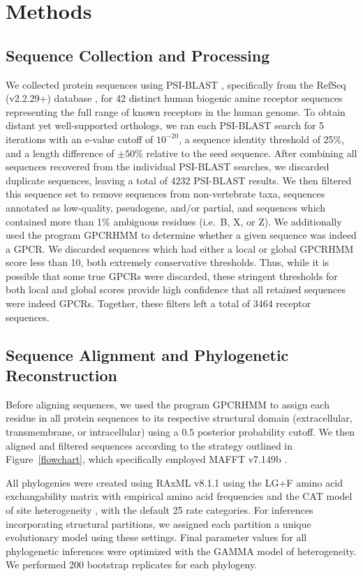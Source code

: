 \documentclass[fleqn,10pt]{wlpeerj}
\begin{document}
\section*{Methods}

\subsection*{Sequence Collection and Processing}
We collected protein sequences using PSI-BLAST \citep{psiblast}, specifically from the RefSeq (v2.2.29+) database \citep{refseq}, for 42 distinct human biogenic amine receptor sequences representing the full range of known receptors in the human genome. To obtain distant yet well-supported orthologs, we ran each PSI-BLAST search for 5 iterations with an e-value cutoff of $10^{-20}$, a sequence identity threshold of 25\%, and a length difference of $\pm50$\% relative to the seed sequence. After combining all sequences recovered from the individual PSI-BLAST searches, we discarded duplicate sequences, leaving a total of 4232 PSI-BLAST results. We then filtered this sequence set to remove sequences from non-vertebrate taxa, sequences annotated as low-quality, pseudogene, and/or partial, and sequences which contained more than 1\% ambiguous residues (i.e.\ B, X, or Z). We additionally used the program GPCRHMM \citep{Wistrand2006} to determine whether a given sequence was indeed a GPCR. We discarded sequences which had either a local or global GPCRHMM score less than 10, both extremely conservative thresholds. Thus, while it is possible that some true GPCRs were discarded, these stringent thresholds for both local and global scores provide high confidence that all retained sequences were indeed GPCRs. Together, these filters left a total of 3464 receptor sequences.


\subsection*{Sequence Alignment and Phylogenetic Reconstruction}
Before aligning sequences, we used the program GPCRHMM \citep{Wistrand2006} to assign each residue in all protein sequences to its respective structural domain (extracellular, transmembrane, or intracellular) using a $0.5$ posterior probability cutoff. We then aligned and filtered sequences according to the strategy outlined in Figure~\ref{flowchart}, which specifically employed MAFFT v7.149b \citep{mafftv7}. 

All phylogenies were created using RAxML v8.1.1 \citep{raxml} using the LG+F \citep{LG} amino acid exchangability matrix with empirical amino acid frequencies and the CAT model of site heterogeneity \citep{Stamatakis2006}, with the default 25 rate categories. For inferences incorporating structural partitions, we assigned each partition a unique evolutionary model using these settings. Final parameter values for all phylogenetic inferences were optimized with the GAMMA model of heterogeneity. We performed 200 bootstrap replicates for each phylogeny.
\end{document}
